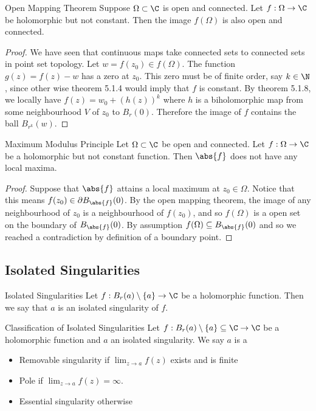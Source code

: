 \documentclass[a4paper]{article}
\begin{document}
\begin{thm}{Open Mapping Theorem}{} Suppose $\Omega\subset\C$ is open and connected. Let $f:\Omega\to\C$ be holomorphic but not constant. Then the image $f(\Omega)$ is also open and connected. 
\begin{proof}
We have seen that continuous maps take connected sets to connected sets in point set topology. Let $w=f(z_0)\in f(\Omega)$. The function $g(z)=f(z)-w$ has a zero at $z_0$. This zero must be of finite order, say $k\in\N$, since other wise theorem 5.1.4 would imply that $f$ is constant. By theorem 5.1.8, we locally have $f(z)=w_0+(h(z))^k$ where $h$ is a biholomorphic map from some neighbourhood $V$ of $z_0$ to $B_r(0)$. Therefore the image of $f$ contains the ball $B_{r^k}(w)$. 
\end{proof}
\end{thm}

\begin{crl}{Maximum Modulus Principle}{} Let $\Omega\subset\C$ be open and connected. Let $f:\Omega\to\C$ be a holomorphic but not constant function. Then $\abs{f}$ does not have any local maxima. 
\begin{proof}
Suppose that $\abs{f}$ attains a local maximum at $z_0\in\Omega$. Notice that this means $f(z_0)\in\partial B_{\abs{f}}(0)$. By the open mapping theorem, the image of any neighbourhood of $z_0$ is a neighbourhood of $f(z_0)$, and so $f(\Omega)$ is a open set on the boundary of $B_{\abs{f}}(0)$. By assumption $f(\Omega)\subseteq B_{\abs{f}}(0)$ and so we reached a contradiction by definition of a boundary point. 
\end{proof}
\end{crl}

\subsection{Isolated Singularities}
\begin{defn}{Isolated Singularities}{} Let $f:B_r(a)\setminus\{a\}\to\C$ be a holomorphic function. Then we say that $a$ is an isolated singularity of $f$. 
\end{defn}

\begin{defn}{Classification of Isolated Singularities}{} Let $f:B_r(a)\setminus\{a\}\subseteq\C\to\C$ be a holomorphic function and $a$ an isolated singularity. We say $a$ is a
\begin{itemize}
\item Removable singularity if $\lim_{z\to a}f(z)$ exists and is finite
\item Pole if $\lim_{z\to a}f(z)=\infty$. 
\item Essential singularity otherwise
\end{itemize}
\end{defn}
\end{document}
